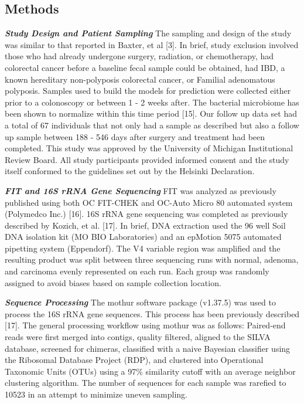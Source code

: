 \documentclass[12pt,]{article}
\begin{document}
\newpage

\subsection{Methods}\label{methods}

\textbf{\emph{Study Design and Patient Sampling}} The sampling and
design of the study was similar to that reported in Baxter, et al
{[}3{]}. In brief, study exclusion involved those who had already
undergone surgery, radiation, or chemotherapy, had colorectal cancer
before a baseline fecal sample could be obtained, had IBD, a known
hereditary non-polyposis colorectal cancer, or Familial adenomatous
polyposis. Samples used to build the models for prediction were
collected either prior to a colonoscopy or between 1 - 2 weeks after.
The bacterial microbiome has been shown to normalize within this time
period {[}15{]}. Our follow up data set had a total of 67 individuals
that not only had a sample as described but also a follow up sample
between 188 - 546 days after surgery and treatment had been completed.
This study was approved by the University of Michigan Institutional
Review Board. All study participants provided informed consent and the
study itself conformed to the guidelines set out by the Helsinki
Declaration.

\textbf{\emph{FIT and 16S rRNA Gene Sequencing}} FIT was analyzed as
previously published using both OC FIT-CHEK and OC-Auto Micro 80
automated system (Polymedco Inc.) {[}16{]}. 16S rRNA gene sequencing was
completed as previously described by Kozich, et al. {[}17{]}. In brief,
DNA extraction used the 96 well Soil DNA isolation kit (MO BIO
Laboratories) and an epMotion 5075 automated pipetting system
(Eppendorf). The V4 variable region was amplified and the resulting
product was split between three sequencing runs with normal, adenoma,
and carcinoma evenly represented on each run. Each group was randomly
assigned to avoid biases based on sample collection location.

\textbf{\emph{Sequence Processing}} The mothur software package
(v1.37.5) was used to process the 16S rRNA gene sequences. This process
has been previously described {[}17{]}. The general processing workflow
using mothur was as follows: Paired-end reads were first merged into
contigs, quality filtered, aligned to the SILVA database, screened for
chimeras, classified with a naive Bayesian classifier using the
Ribosomal Database Project (RDP), and clustered into Operational
Taxonomic Units (OTUs) using a 97\% similarity cutoff with an average
neighbor clustering algorithm. The number of sequences for each sample
was rarefied to 10523 in an attempt to minimize uneven sampling.
\end{document}
